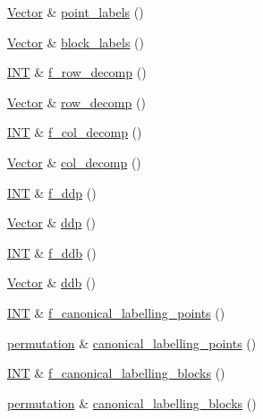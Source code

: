 \begin{DoxyCompactItemize}
\item 
\mbox{\hyperlink{class_vector}{Vector}} \& \mbox{\hyperlink{classgeometry_aa80150b549283d56c347b8533d9051b0}{point\+\_\+labels}} ()
\item 
\mbox{\hyperlink{class_vector}{Vector}} \& \mbox{\hyperlink{classgeometry_ab40ecc05e06399138dc6354d790d302b}{block\+\_\+labels}} ()
\item 
\mbox{\hyperlink{galois_8h_a09fddde158a3a20bd2dcadb609de11dc}{I\+NT}} \& \mbox{\hyperlink{classgeometry_a149ccf1dac87cbced60547e9608bb42d}{f\+\_\+row\+\_\+decomp}} ()
\item 
\mbox{\hyperlink{class_vector}{Vector}} \& \mbox{\hyperlink{classgeometry_a58652b4a0edda52732517a06d390882d}{row\+\_\+decomp}} ()
\item 
\mbox{\hyperlink{galois_8h_a09fddde158a3a20bd2dcadb609de11dc}{I\+NT}} \& \mbox{\hyperlink{classgeometry_ae0713575216fd4c562da43a469f5edcb}{f\+\_\+col\+\_\+decomp}} ()
\item 
\mbox{\hyperlink{class_vector}{Vector}} \& \mbox{\hyperlink{classgeometry_a12425a7d0cebea16e0d22c44e7fbe555}{col\+\_\+decomp}} ()
\item 
\mbox{\hyperlink{galois_8h_a09fddde158a3a20bd2dcadb609de11dc}{I\+NT}} \& \mbox{\hyperlink{classgeometry_a8facc1a86c731a6fb9d30346354987bf}{f\+\_\+ddp}} ()
\item 
\mbox{\hyperlink{class_vector}{Vector}} \& \mbox{\hyperlink{classgeometry_ae00a20f0f75a511d639318673986028e}{ddp}} ()
\item 
\mbox{\hyperlink{galois_8h_a09fddde158a3a20bd2dcadb609de11dc}{I\+NT}} \& \mbox{\hyperlink{classgeometry_a1b01f7c645961c3a04b167fc2bf0d2c8}{f\+\_\+ddb}} ()
\item 
\mbox{\hyperlink{class_vector}{Vector}} \& \mbox{\hyperlink{classgeometry_a7a47161530f508d7aeb853a090a6eef8}{ddb}} ()
\item 
\mbox{\hyperlink{galois_8h_a09fddde158a3a20bd2dcadb609de11dc}{I\+NT}} \& \mbox{\hyperlink{classgeometry_a0695b0c3dc2a75a232631dfda609daf7}{f\+\_\+canonical\+\_\+labelling\+\_\+points}} ()
\item 
\mbox{\hyperlink{classpermutation}{permutation}} \& \mbox{\hyperlink{classgeometry_ac426783bf96ded3a50f6746f521bdd31}{canonical\+\_\+labelling\+\_\+points}} ()
\item 
\mbox{\hyperlink{galois_8h_a09fddde158a3a20bd2dcadb609de11dc}{I\+NT}} \& \mbox{\hyperlink{classgeometry_a48f58feb451efdf72ce2a5c3411b62c1}{f\+\_\+canonical\+\_\+labelling\+\_\+blocks}} ()
\item 
\mbox{\hyperlink{classpermutation}{permutation}} \& \mbox{\hyperlink{classgeometry_a6d9453619be9ea76e6e63485594b301f}{canonical\+\_\+labelling\+\_\+blocks}} ()

\end{DoxyCompactItemize}
